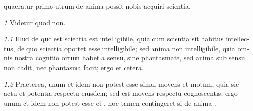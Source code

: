 \documentclass[a4paper, 12pt]{book}
\newcommand{\metatext}[1]{<#1>}
\newcommand{\no}[1]{\emph{#1}\quad}
\begin{document}
\begin{latin}
\beginnumbering

\pstart[\subsection*{\metatext{De scientia}}]
%
%
quaeratur
primo utrum de anima possit nobis acquiri scientia.
\pend

\medbreak

\pstart[\medbreak{}]
%
\no{1}
Videtur quod non.
\pend

\pstart
{}%
\no{1.1}
Illud de quo est scientia est intelligibile, quia cum scientia sit habitus
intellectus, de quo  scientia oportet esse intelligibile; sed anima non 
intelligibile, quia omnis nostra cognitio ortum habet a sensu,  sine phantasmate, sed anima sub sensu non cadit, nec
phantasma facit; ergo et cetera.
\pend

\pstart
{}%
\no{1.2}
Praeterea, unum et idem non potest esse simul movens et motum,
quia sic  actu et potentia respectu
eiusdem; sed  est movens respectu cognoscentis; ergo unum et idem non
potest esse  et
, hoc tamen
contingeret si de anima .
\pend

\endnumbering
\end{latin}
\end{document}
